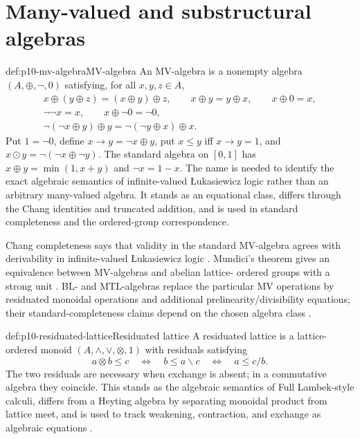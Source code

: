 \section{Many-valued and substructural algebras}
\label{sec:p10-many-substructural}

\begin{hbdefinition}{def:p10-mv-algebra}{MV-algebra}
An MV-algebra is a nonempty algebra \((A,\oplus,\neg,0)\) satisfying, for all
\(x,y,z\in A\),
\[
\begin{gathered}
x\oplus(y\oplus z)=(x\oplus y)\oplus z,\qquad
x\oplus y=y\oplus x,\qquad x\oplus0=x,\\
\neg\neg x=x,\qquad x\oplus\neg0=\neg0,\\
\neg(\neg x\oplus y)\oplus y
=\neg(\neg y\oplus x)\oplus x.
\end{gathered}
\]
Put \(1=\neg0\), define \(x\to y=\neg x\oplus y\), put
\(x\le y\) iff \(x\to y=1\), and
\(x\odot y=\neg(\neg x\oplus\neg y)\). The standard algebra on \([0,1]\) has
\(x\oplus y=\min(1,x+y)\) and \(\neg x=1-x\). The name is needed to identify
the exact algebraic semantics of infinite-valued \L{}ukasiewicz logic rather
than an arbitrary many-valued algebra. It stands as an equational class,
differs through the Chang identities and truncated addition, and is used in
standard completeness and the ordered-group correspondence.
\end{hbdefinition}

Chang completeness says that validity in the standard MV-algebra agrees with
derivability in infinite-valued \L{}ukasiewicz logic \cite{Chang1958,Chang1959}.
Mundici's theorem gives an equivalence between MV-algebras and abelian lattice-
ordered groups with a strong unit \cite{Mundici1986}. BL- and MTL-algebras
replace the particular MV operations by residuated monoidal operations and
additional prelinearity/divisibility equations; their standard-completeness
claims depend on the chosen algebra class \cite{Hajek1998,
CignoliDOttavianoMundici2000}.

\begin{hbdefinition}{def:p10-residuated-lattice}{Residuated lattice}
A residuated lattice is a lattice-ordered monoid
\((A,\wedge,\vee,\otimes,1)\) with residuals satisfying
\[
 a\otimes b\le c
 \quad\Longleftrightarrow\quad
 b\le a\backslash c
 \quad\Longleftrightarrow\quad
 a\le c/b.
\]
The two residuals are necessary when exchange is absent; in a commutative
algebra they coincide. This stands as the algebraic semantics of Full
Lambek-style calculi, differs from a Heyting algebra by separating monoidal
product from lattice meet, and is used to track weakening, contraction, and
exchange as algebraic equations \cite{OnoKomori1985,
GalatosJipsenKowalskiOno2007}.
\end{hbdefinition}

